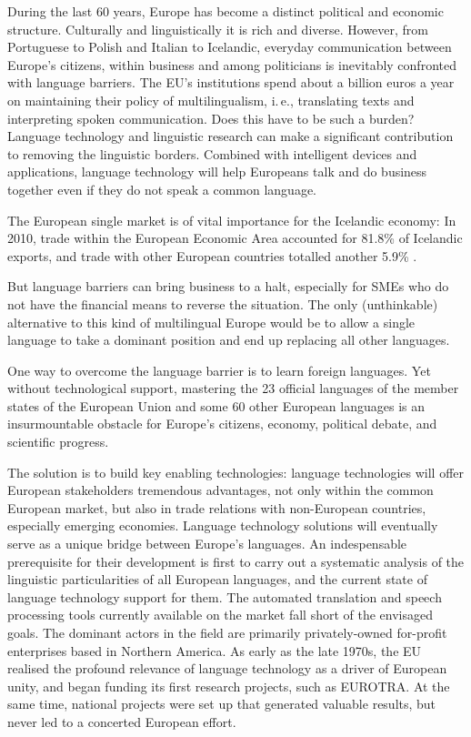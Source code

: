 \begin{multicols}{2}

During the last 60 years, Europe has become a distinct political and economic structure. Culturally and linguistically it is rich and diverse. However, from Portuguese to Polish and Italian to Icelandic, everyday communication between Europe’s citizens, within business and among politicians is inevitably confronted with language barriers. The EU's institutions spend about a billion euros a year on maintaining their policy of multilingualism, i.\,e., translating texts and interpreting spoken communication. Does this have to be such a burden? Language technology and linguistic research can make a significant contribution to removing the linguistic borders. Combined with intelligent devices and applications, language technology will help Europeans talk and do business together even if they do not speak a common language.
 
The European single market is of vital importance for the Icelandic economy: In 2010, trade within the European Economic Area accounted for 81.8\% of Icelandic exports, and trade with other European countries totalled another 5.9\% \cite{hag3}. 

But language barriers can bring business to a halt, especially for SMEs who do not have the financial means to reverse the situation. The only (unthinkable) alternative to this kind of multilingual Europe would be to allow a single language to take a dominant position and end up replacing all other languages.

One way to overcome the language barrier is to learn foreign languages. Yet without technological support, mastering the 23 official languages of the member states of the European Union and some 60 other European languages is an insurmountable obstacle for Europe’s citizens, economy, political debate, and scientific progress.

The solution is to build key enabling technologies: language technologies will offer European stakeholders tremendous advantages, not only within the common European market, but also in trade relations with non-European countries, especially emerging economies.
Language technology solutions will eventually serve as a unique bridge between Europe's languages. An indespensable prerequisite for their development is first to carry out a systematic analysis of the linguistic particularities of all European languages, and the current state of language technology support for them.  
The automated translation and speech processing tools currently available on the market fall short of the envisaged goals. The dominant actors in the field are primarily privately-owned for-profit enterprises based in Northern America. As early as the late 1970s, the EU realised the profound relevance of language technology as a driver of European unity, and began funding its first research projects, such as EUROTRA. At the same time, national projects were set up that generated valuable results, but never led to a concerted European effort.


\end{multicols}
